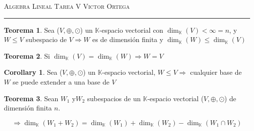\documentclass[12pt]{article}
\newcommand\K{\ensuremath{\mathbb{K}}}
\begin{document}
\thispagestyle{empty}

{\scshape Algebra Lineal} \hfill {\scshape \large Tarea V} \hfill {\scshape Victor Ortega}
 
\smallskip

\hrule

\bigskip

\bigskip

\theoremstyle{definition}
\newtheorem*{definition}{Definición}

\theoremstyle{definition}
\newtheorem*{remark}{Observación}

\theoremstyle{definition}
\newtheorem*{dem}{Demostración}

\theoremstyle{definition}
\newtheorem*{notation}{Notación}

\theoremstyle{definition}
\newtheorem*{theorem}{Teorema}

\theoremstyle{definition}
\newtheorem*{lema}{Lema}

\theoremstyle{definition}
\newtheorem*{corollary}{Corollary}

\theoremstyle{remark}
\newtheorem*{observation}{Observación}

\theoremstyle{remark}
\newtheorem*{example}{Ejemplo}


\begin{theorem} \label{tarea5og}
    Sea ($V, \oplus, \odot$) un $\K$-espacio vectorial con ${\dim}_{\K}(V) <  \infty = n$, y $W \leq V$ subespacio de $V \Rightarrow W$ es de dimensión finita y ${\dim}_{\K}(W) \leqslant {\dim}_{\K}(V)$
\end{theorem}

\begin{theorem} \label{theomtarea5}
    Si ${\dim}_{\K}(V) = {\dim}_{\K}(W) \Rightarrow W = V$
\end{theorem}

\begin{corollary}
    Sea ($V, \oplus, \odot$) un $\K$-espacio vectorial, $W \leq V \Rightarrow $ cualquier base de $W$ se puede extender a una base de $V$
\end{corollary}

\begin{theorem}
    Sean $W_1$ y$ W_2$ subespacios de un $\K$-espacio vectorial ($V, \oplus, \odot$) de dimensión finita $n$.

    $$\Rightarrow {\dim}_{\K}(W_1+W_2) = {\dim}_{\K}(W_1) + {\dim}_{\K}(W_2) - {\dim}_{\K}(W_1 \cap W_2)$$
\end{theorem}
\end{document}
